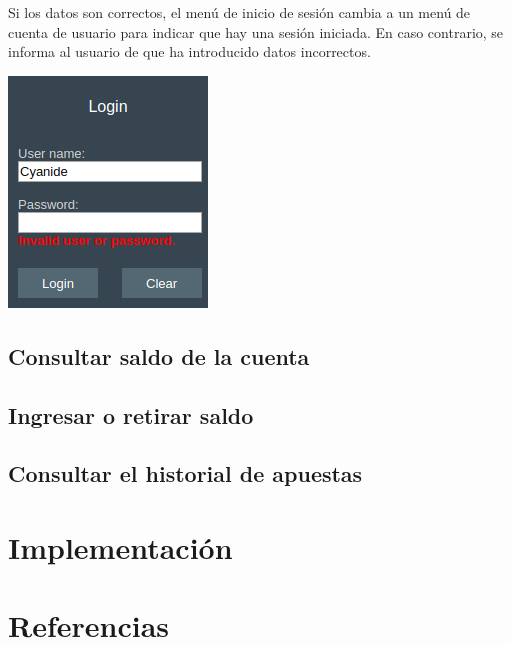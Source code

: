 \documentclass{article}
\begin{document}
\newpage
Si los datos son correctos, el menú de inicio de sesión cambia a un menú de cuenta de usuario para indicar que hay una sesión iniciada. En caso contrario, se informa al usuario de que ha introducido datos incorrectos.
\vspace{-12pt}
\begin{center}
    \includegraphics[width=.25\linewidth]{login2}
\end{center}
\medbreak
\subsection{Consultar saldo de la cuenta}
\subsection{Ingresar o retirar saldo}
\subsection{Consultar el historial de apuestas}
\section{Implementación}
\section{Referencias}
\end{document}
